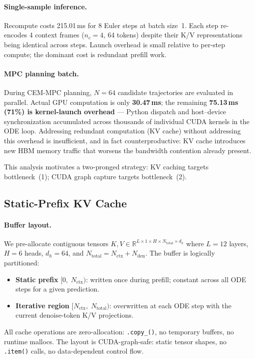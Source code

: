 \documentclass[letterpaper,twocolumn,10pt]{article}
\begin{document}
\paragraph{Single-sample inference.}
Recompute costs 215.01\,ms for 8 Euler steps at batch size~1.  Each
step re-encodes 4 context frames ($n_c{=}4$, 64 tokens) despite their
K/V representations being identical across steps.  Launch overhead is
small relative to per-step compute; the dominant cost is redundant
prefill work.

\paragraph{MPC planning batch.}
During CEM-MPC planning, $N{=}64$ candidate trajectories are evaluated
in parallel.  Actual GPU computation is only \textbf{30.47\,ms}; the
remaining \textbf{75.13\,ms (71\%) is kernel-launch overhead} ---
Python dispatch and host--device synchronization accumulated across
thousands of individual CUDA kernels in the ODE loop.  Addressing
redundant computation (KV cache) without addressing this overhead
is insufficient, and in fact counterproductive: KV cache introduces
new HBM memory traffic that worsens the bandwidth contention already
present.

This analysis motivates a two-pronged strategy: KV caching targets
bottleneck~(1); CUDA graph capture targets bottleneck~(2).

\subsection{Static-Prefix KV Cache}
\label{sec:kvcache}

\paragraph{Buffer layout.}
We pre-allocate contiguous tensors
$K, V \in \mathbb{R}^{L \times 1 \times H \times N_\text{total}
\times d_h}$
where $L{=}12$ layers, $H{=}6$ heads, $d_h{=}64$, and
$N_\text{total} {=} N_\text{ctx} {+} N_\text{den}$.
The buffer is logically partitioned:
\begin{itemize}
  \item \textbf{Static prefix} $[0,\; N_\text{ctx})$: written once
        during prefill; constant across all ODE steps for a given
        prediction.
  \item \textbf{Iterative region} $[N_\text{ctx},\; N_\text{total})$:
        overwritten at each ODE step with the current denoise-token
        K/V projections.
\end{itemize}
All cache operations are zero-allocation: \texttt{.copy\_()},
no temporary buffers, no runtime mallocs.  The layout is
CUDA-graph-safe: static tensor shapes, no \texttt{.item()} calls,
no data-dependent control flow.
\end{document}
